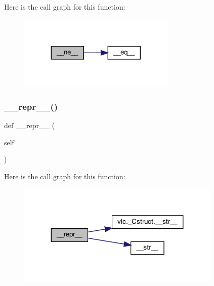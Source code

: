 Here is the call graph for this function\+:
\nopagebreak
\begin{figure}[H]
\begin{center}
\leavevmode
\includegraphics[width=212pt]{classvlc_1_1___enum_aa0b54a20b36fcc55e1147de88d083072_cgraph}
\end{center}
\end{figure}
\mbox{\label{classvlc_1_1___enum_a9a47563093dfc5ba12274b66e368920c}} 
\subsubsection{\texorpdfstring{\+\_\+\+\_\+repr\+\_\+\+\_\+()}{\_\_repr\_\_()}}
{\footnotesize\ttfamily def \+\_\+\+\_\+repr\+\_\+\+\_\+ (\begin{DoxyParamCaption}\item[{}]{self }\end{DoxyParamCaption})}

Here is the call graph for this function\+:
\nopagebreak
\begin{figure}[H]
\begin{center}
\leavevmode
\includegraphics[width=275pt]{classvlc_1_1___enum_a9a47563093dfc5ba12274b66e368920c_cgraph}
\end{center}
\end{figure}
\mbox{\label{classvlc_1_1___enum_a23e8041ce1015febe4fdace3225714f9}} 
